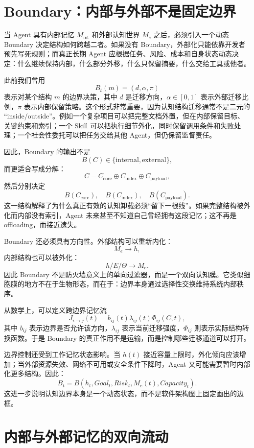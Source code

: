 \section{Boundary：内部与外部不是固定边界}

当 Agent 具有内部记忆 \(M_{\mathrm{int}}\) 和外部认知世界 \(M_e\) 之后，必须引入一个动态 Boundary 决定结构如何跨越二者。如果没有 Boundary，外部化只能依靠开发者预先写死规则；而真正长期 Agent 应根据任务、风险、成本和自身状态动态决定：什么继续保持内部，什么部分外移，什么只保留摘要，什么交给工具或他者。

此前我们曾用
\[
B_t(m)
=
(d,\alpha,\pi)
\]
表示对某个结构 \(m\) 的边界决策，其中 \(d\) 是迁移方向，\(\alpha\in[0,1]\) 表示外部迁移比例，\(\pi\) 表示内部保留策略。这个形式非常重要，因为认知结构迁移通常不是二元的 ``inside/outside''。例如一个复杂项目可以把完整文档外置，但在内部保留目标、关键约束和索引；一个 Skill 可以把执行细节外化，同时保留调用条件和失败处理；一个社会性委托可以把任务交给其他 Agent，但仍保留监督责任。

因此，Boundary 的输出不是
\[
B(C)\in\{\mathrm{internal},\mathrm{external}\},
\]
而更适合写成分解：
\[
C
=
C_{\mathrm{core}}
\oplus
C_{\mathrm{index}}
\oplus
C_{\mathrm{payload}},
\]
然后分别决定
\[
B(C_{\mathrm{core}}),
\quad
B(C_{\mathrm{index}}),
\quad
B(C_{\mathrm{payload}}).
\]
这一结构解释了为什么真正有效的认知卸载必须``留下一根线''。如果完整结构被外化而内部没有索引，Agent 未来甚至不知道自己曾经拥有这段记忆；这不再是 offloading，而接近遗失。

Boundary 还必须具有方向性。外部结构可以重新内化：
\[
M_e\rightarrow h,
\]
内部结构也可以被外化：
\[
h/E/\Theta\rightarrow M_e.
\]
因此 Boundary 不是防火墙意义上的单向过滤器，而是一个双向认知膜。它类似细胞膜的地方不在于生物形态，而在于：边界本身通过选择性交换维持系统内部秩序。

从数学上，可以定义跨边界记忆流
\[
J_{i\rightarrow j}(t)
=
b_{ij}(t)\lambda_{ij}(t)\Phi_{ij}(C,t),
\]
其中 \(b_{ij}\) 表示边界是否允许该方向，\(\lambda_{ij}\) 表示当前迁移强度，\(\Phi_{ij}\) 则表示实际结构转换函数。于是 Boundary 的真正作用不是运输，而是控制哪些迁移通道可以打开。

边界控制还受到工作记忆状态影响。当 \(h(t)\) 接近容量上限时，外化倾向应该增加；当外部资源失效、网络不可用或安全条件下降时，Agent 又可能需要暂时内部化更多结构。因此：
\[
B_t
=
B(
h_t,
Goal_t,
Risk_t,
M_e(t),
Capacity_t
).
\]
这进一步说明认知边界本身是一个动态状态，而不是软件架构图上固定画出的边框。

\section{内部与外部记忆的双向流动}

